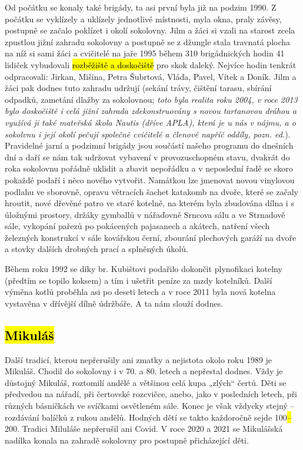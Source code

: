 Od počátku se konaly také brigády, ta asi první byla již na podzim 1990.
Z počátku se vyklízely a uklízely jednotlivé místnosti, myla okna, praly
závěsy, postupně se začalo poklízet i okolí sokolovny. Jilm a žáci si
vzali na starost zcela zpustlou jižní zahradu sokolovny a postupně se z
džungle stala travnatá plocha na níž si sami žáci a cvičitelé na jaře
1995 během 310 brigádnických hodin 41 lidiček vybudovali \hl{rozběžiště
a doskočiště} pro skok daleký. Nejvíce hodin tenkrát odpracovali:
Jirkan, Mišina, Petra Šubrtová, Vláďa, Pavel, Vítek a Doník. Jilm a žáci
pak dodnes tuto zahradu udržují (sekání trávy, čištění tarasu, sbírání
odpadků, zametání dlažby za sokolovnou; \emph{toto byla realita roku
2004, v roce 2013 bylo doskočiště i celá jižní zahrada zdekonstruovány s
novou tartanovou dráhou a využívá ji také mateřská škola Nautis (dříve
APLA), která je u nás v nájmu, a o sokolvnu i její okolí pečují společně
cvičitelé a členové napříč oddíly, pozn. ed.}). Pravidelné jarní a
podzimní brigády jsou součástí našeho programu do dnešních dní a daří se
nám tak udržovat vybavení v provozuschopném stavu, dvakrát do roka
sokolovnu pořádně uklidit a zbavit nepořádku a v neposlední řadě se
skoro pokaždé podaří i něco nového vytvořit. Namátkou lze jmenovat novou
vinylovou podlahu ve sborovně, opravu větracích šachet katakomb na
dvoře, které se začaly hroutit, nové dřevěné patro ve staré kotelně, na
kterém byla zbudována dílna i s úložnými prostory, držáky gymballů v
nářaďovně Srncova sálu a ve Strnadově sále, vykopání pařezů po
pokácených pajasanech a akátech, natření všech železných konstrukcí v
sále kovářskou černí, zbourání plechových garáží na dvoře a stovky
dalších drobných prací a splněných úkolů.

Během roku 1992 se díky br. Kubištovi podařilo dokončit plynofikaci
kotelny (předtím se topilo koksem) a tím i ušetřit peníze za mzdy
kotelníků. Další výměna kotlů proběhla asi po deseti letech a v roce
2011 byla nová kotelna vystavěna v dřívější dílně údržbáře. A ta nám
slouží dodnes.

\subsection{\texorpdfstring{\hl{Mikuláš}}{Mikuláš}}\label{mikuluxe1ux161}

Další tradicí, kterou nepřerušily ani zmatky a nejistota okolo roku 1989
je Mikuláš. Chodil do sokolovny i v 70. a 80. letech a nepřestal dodnes.
Vždy je důstojný Mikuláš, roztomilí andělé a většinou celá kupa „zlých``
čertů. Děti se předvedou na nářadí, při čertovské rozcvičce, anebo, jako
v posledních letech, při různých básničkách ve svíčkami osvětleném sále.
Konec je však vždycky stejný -- rozdávání balíčků z rukou andělů.
Hodných dětí se takto každoročně sejde 100\emph{\hl{--}}200. Tradici
Miluláše nepřerušil ani Covid. V roce 2020 a 2021 se Mikulášská nadílka
konala na zahradě sokolovny pro postupně přicházející děti.

